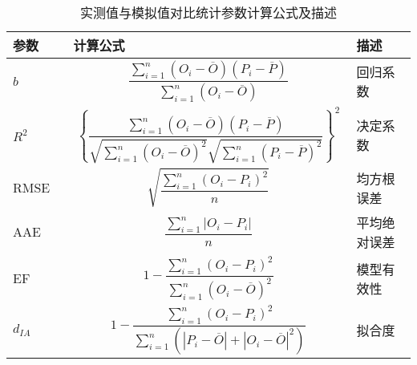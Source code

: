 \begin{table}
    \caption{实测值与模拟值对比统计参数计算公式及描述}
    \begin{tabular}{p{0.15\linewidth}p{0.7\linewidth}p{0.15\linewidth}}
        \toprule
        参数     & 计算公式                                                                                                                                                                      & 描述         \\
        \midrule
        $b$      & $$\frac{\sum_{i=1}^n (O_i - \overline{O}) (P_i - \overline{P})}{\sum_{i=1}^n (O_i - \overline{O})}$$                                                                          & 回归系数     \\
        $R^2$    & $$\left \{ \frac{\sum_{i=1}^n (O_i - \overline{O}) (P_i - \overline{P})}{\sqrt{\sum_{i=1}^n (O_i - \overline{O})^2} \sqrt{\sum_{i=1}^n (P_i - \overline{P})^2}} \right \}^2$$ & 决定系数     \\
        RMSE     & $$\sqrt{\frac{\sum_{i=1}^n (O_i - P_i)^2}{n}}$$                                                                                                                               & 均方根误差   \\
        AAE      & $$\frac{\sum_{i=1}^n |O_i - P_i|}{n}$$                                                                                                                                        & 平均绝对误差 \\
        EF       & $$1 - \frac{\sum_{i=1}^n (O_i - P_i)^2}{\sum_{i=1}^n (O_i - \overline{O})^2}$$                                                                                                & 模型有效性   \\
        $d_{IA}$ & $$1 - \frac{\sum_{i=1}^n (O_i - P_i)^2}{\sum_{i=1}^n (|P_i - \overline{O}| + |O_i - \overline{O}|^2)}$$                                                                       & 拟合度       \\
        \bottomrule
    \end{tabular}
\end{table}


